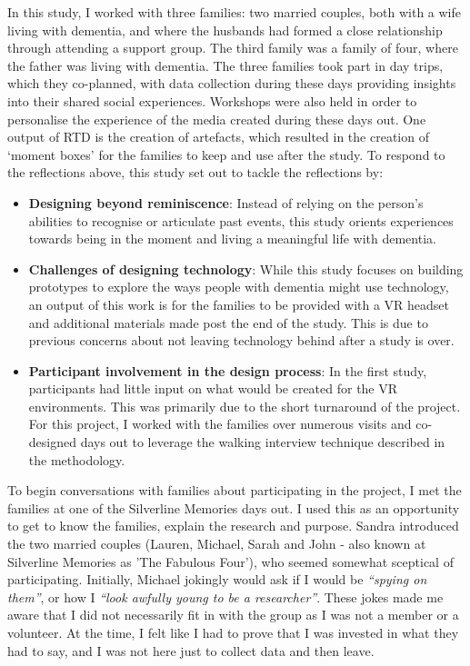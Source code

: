 In this study, I worked with three families: two married couples, both with a wife living with dementia, and where the husbands had formed a close relationship through attending a support group. The third family was a family of four, where the father was living with dementia. The three families took part in day trips, which they co-planned, with data collection during these days providing insights into their shared social experiences. Workshops were also held  in order to personalise the experience of the media created during these days out. One output of RTD is the creation of artefacts, which resulted in the creation of `moment boxes' for the families to keep and use after the study. To respond to the reflections above, this study set out to tackle the reflections by:

\begin{itemize}
    \item \textbf{Designing beyond reminiscence}: Instead of relying on the person's abilities to recognise or articulate past events, this study orients experiences towards being in the moment and living a meaningful life with dementia.

    \item \textbf{Challenges of designing technology}: While this study focuses on building prototypes to explore the ways people with dementia might use technology, an output of this work is for the families to be provided with a VR headset and additional materials made post the end of the study. This is due to previous concerns about not leaving technology behind after a study is over.

    \item \textbf{Participant involvement in the design process}: In the first study, participants had little input on what would be created for the VR environments. This was primarily due to the short turnaround of the project. For this project, I worked with the families over numerous visits and co-designed days out to leverage the walking interview technique described in the methodology.
\end{itemize}

To begin conversations with families about participating in the project, I met the families at one of the Silverline Memories days out. I used this as an opportunity to get to know the families, explain the research and purpose. Sandra introduced the two married couples (Lauren, Michael, Sarah and John - also known at Silverline Memories as 'The Fabulous Four'), who seemed somewhat sceptical of participating. Initially, Michael jokingly would ask if I would be \textit{``spying on them''}, or how I \textit{``look awfully young to be a researcher''}. These jokes made me aware that I did not necessarily fit in with the group as I was not a member or a volunteer. At the time, I felt like I had to prove that I was invested in what they had to say, and I was not here just to collect data and then leave. 

